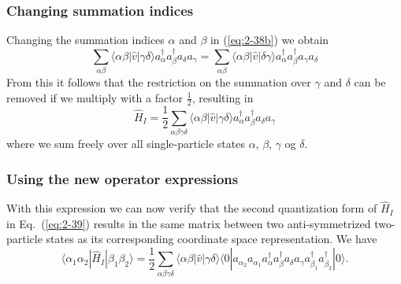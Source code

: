 \documentclass{beamer}
\begin{document}
\begin{frame}
\frametitle{Changing summation indices}

Changing the summation indices 
$\alpha$ and $\beta$ in (\ref{eq:2-38b}) we obtain
\begin{equation}
	\sum_{\alpha\beta} \langle \alpha\beta|\hat{v}|\gamma\delta\rangle a^{\dagger}_\alpha a^{\dagger}_\beta a_\delta a_\gamma =
		 \sum_{\alpha\beta} \langle \alpha\beta|\hat{v}|\delta\gamma\rangle 
		  a^{\dagger}_\alpha a^{\dagger}_\beta  a_\gamma a_\delta \label{eq:2-38c}
\end{equation}
From this it follows that the restriction on the summation over $\gamma$ and $\delta$ can be removed if we multiply with a factor $\frac{1}{2}$, resulting in 
\begin{equation}
	\hat{H}_I = \frac{1}{2} \sum_{\alpha\beta\gamma\delta} \langle \alpha\beta|\hat{v}|\gamma\delta\rangle
		a^{\dagger}_\alpha a^{\dagger}_\beta a_\delta a_\gamma \label{eq:2-39}
\end{equation}
where we sum freely over all single-particle states $\alpha$, 
$\beta$, $\gamma$ og $\delta$.
\end{frame}

\begin{frame}
\frametitle{Using the new operator expressions}

With this expression we can now verify that the second quantization form of $\hat{H}_I$ in Eq.~(\ref{eq:2-39}) 
results in the same matrix between two anti-symmetrized two-particle states as its corresponding coordinate
space representation. We have  
\begin{equation}
	\langle \alpha_1 \alpha_2|\hat{H}_I|\beta_1 \beta_2\rangle =
		\frac{1}{2} \sum_{\alpha\beta\gamma\delta}
			\langle \alpha\beta|\hat{v}|\gamma\delta\rangle \langle 0|a_{\alpha_2} a_{\alpha_1} 
			 a^{\dagger}_\alpha a^{\dagger}_\beta a_\delta a_\gamma 
			 a_{\beta_1}^{\dagger} a_{\beta_2}^{\dagger}|0\rangle. \label{eq:2-40}
\end{equation}
\end{frame}
\end{document}
